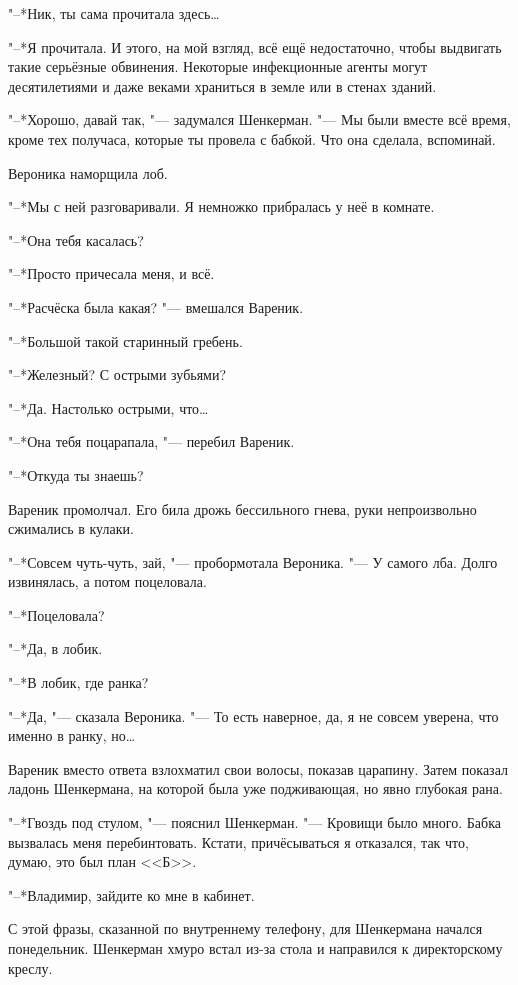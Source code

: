 "--*Ник, ты сама прочитала здесь\ldots{}

"--*Я прочитала.
И этого, на мой взгляд, всё ещё недостаточно, чтобы выдвигать такие серьёзные обвинения.
Некоторые инфекционные агенты могут десятилетиями и даже веками храниться в земле или в стенах зданий.

"--*Хорошо, давай так, "--- задумался Шенкерман.
"--- Мы были вместе всё время, кроме тех получаса, которые ты провела с бабкой.
Что она сделала, вспоминай.

Вероника наморщила лоб.

"--*Мы с ней разговаривали.
Я немножко прибралась у неё в комнате.

"--*Она тебя касалась?

"--*Просто причесала меня, и всё.

"--*Расчёска была какая? "--- вмешался Вареник.

"--*Большой такой старинный гребень.

"--*Железный?
С острыми зубьями?

"--*Да.
Настолько острыми, что\ldots{}

"--*Она тебя поцарапала, "--- перебил Вареник.

"--*Откуда ты знаешь?

Вареник промолчал.
Его била дрожь бессильного гнева, руки непроизвольно сжимались в кулаки.

"--*Совсем чуть-чуть, зай, "--- пробормотала Вероника.
"--- У самого лба.
Долго извинялась, а потом поцеловала.

"--*Поцеловала?

"--*Да, в лобик.

"--*В лобик, где ранка?

"--*Да, "--- сказала Вероника.
"--- То есть наверное, да, я не совсем уверена, что именно в ранку, но\ldots{}

Вареник вместо ответа взлохматил свои волосы, показав царапину.
Затем показал ладонь Шенкермана, на которой была уже подживающая, но явно глубокая рана.

"--*Гвоздь под стулом, "--- пояснил Шенкерман.
"--- Кровищи было много.
Бабка вызвалась меня перебинтовать.
Кстати, причёсываться я отказался, так что, думаю, это был план <<Б>>.

\asterism

\label{Mon_2012_07_09}

"--*Владимир, зайдите ко мне в кабинет.

С этой фразы, сказанной по внутреннему телефону, для Шенкермана начался понедельник.
Шенкерман хмуро встал из-за стола и направился к директорскому креслу.

